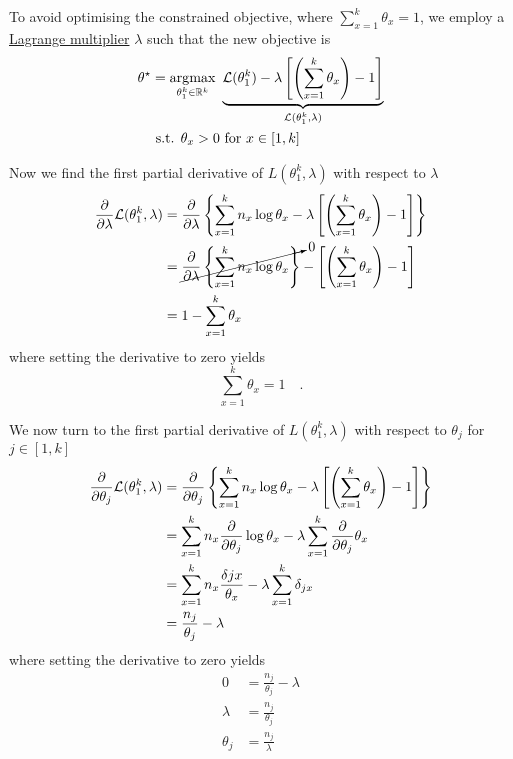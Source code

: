 To avoid optimising the constrained objective, where $\sum_{x=1}^k \theta_x = 1$, we employ a \href{https://en.wikipedia.org/wiki/Lagrange_multiplier}{Lagrange multiplier} $\lambda$ such that the new objective is
\begin{subequations}
\begin{align}
\theta^\star &= \operatorname*{\arg\!\max}_{\theta_1^k \in \mathbb R^k} ~ \underbrace{\mathcal L(\theta_1^k) - \lambda \left[ \left(\sum_{x=1}^k \theta_x\right) - 1\right]}_{\mathcal L(\theta_1^k, \lambda)} \\
 &~\text{s.t. } \theta_x > 0 \text{ for }x \in [1, k] \nonumber
\end{align}
\end{subequations}


Now we find the first partial derivative of  $L(\theta_1^k, \lambda)$ with respect to $\lambda$
\begin{subequations}
\begin{align}
	\pdv{\lambda}\mathcal L(\theta_1^k, \lambda) &= \pdv{\lambda} \left\{ \sum_{x=1}^k n_x \log \theta_x  - \lambda \left[ \left(\sum_{x=1}^k \theta_x\right) - 1 \right] \right\} \\
	&= \cancelto{0}{\pdv{\lambda} \left\{ \sum_{x=1}^k n_x \log \theta_x  \right\} } - \left[ \left(\sum_{x=1}^k \theta_x\right) - 1 \right] \\
	&= 1 - \sum_{x=1}^k \theta_x
\end{align}
\end{subequations}
where setting the derivative to zero yields
\begin{equation} \label{eq:cat-const}
	\sum_{x=1}^k \theta_x = 1 \quad . 
\end{equation}

We now turn to the first partial derivative of $L(\theta_1^k, \lambda)$ with respect to $\theta_j$ for $j \in [1, k]$
\begin{subequations}
\begin{align}
	\pdv{\theta_j}\mathcal L(\theta_1^k, \lambda) &= \pdv{\theta_j} \left\{ \sum_{x=1}^k n_x \log \theta_x  - \lambda \left[ \left(\sum_{x=1}^k \theta_x\right) - 1 \right] \right\} \\
	&= \sum_{x=1}^k n_x  \pdv{\theta_j} \log \theta_x - \lambda  \sum_{x=1}^k \pdv{\theta_j} \theta_x \\
	&= \sum_{x=1}^k n_x \frac{\delta{jx}}{\theta_x} - \lambda  \sum_{x=1}^k \delta_{jx} \\
	&= \frac{n_j}{\theta_j} - \lambda
\end{align}
\end{subequations}
where setting the derivative to zero yields
\begin{subequations}
\begin{align}
0 &= \frac{n_j}{\theta_j} -\lambda \\
\lambda &= \frac{n_j}{\theta_j} \\
\theta_j &= \frac{n_j}{\lambda} \label{eq:thetaj}
\end{align}
\end{subequations}

